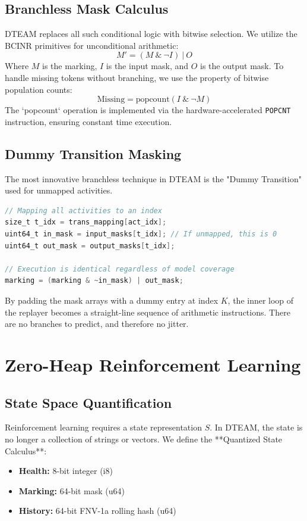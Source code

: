 \documentclass[12pt,a4paper]{report}
\begin{document}
\section{Branchless Mask Calculus}
DTEAM replaces all such conditional logic with bitwise selection. We utilize the BCINR primitives for unconditional arithmetic:
\begin{equation}
M' = (M \ \& \ \neg I) \ | \ O
\end{equation}
Where $M$ is the marking, $I$ is the input mask, and $O$ is the output mask. To handle missing tokens without branching, we use the property of bitwise population counts:
\begin{equation}
\text{Missing} = \text{popcount}(I \ \& \ \neg M)
\end{equation}
The `popcount` operation is implemented via the hardware-accelerated \texttt{POPCNT} instruction, ensuring constant time execution.

\section{Dummy Transition Masking}
The most innovative branchless technique in DTEAM is the "Dummy Transition" used for unmapped activities.
\begin{lstlisting}[language=C, caption=Branchless Hot Path in DTEAM]
// Mapping all activities to an index
size_t t_idx = trans_mapping[act_idx];
uint64_t in_mask = input_masks[t_idx]; // If unmapped, this is 0
uint64_t out_mask = output_masks[t_idx];

// Execution is identical regardless of model coverage
marking = (marking & ~in_mask) | out_mask;
\end{lstlisting}
By padding the mask arrays with a dummy entry at index $K$, the inner loop of the replayer becomes a straight-line sequence of arithmetic instructions. There are no branches to predict, and therefore no jitter.

\chapter{Zero-Heap Reinforcement Learning}
\section{State Space Quantification}
Reinforcement learning requires a state representation $S$. In DTEAM, the state is no longer a collection of strings or vectors. We define the **Quantized State Calculus**:
\begin{itemize}
    \item \textbf{Health:} 8-bit integer (i8)
    \item \textbf{Marking:} 64-bit mask (u64)
    \item \textbf{History:} 64-bit FNV-1a rolling hash (u64)
\end{itemize}
\end{document}
